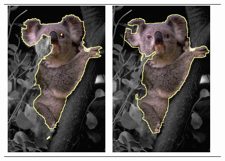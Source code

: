 \documentclass[smallextended]{svjour3}       %
\begin{document}
{{\begin{figure}[ht!]
\begin{tabular}{ccc}
 	\includegraphics[scale=0.25]{images/segmentation/bc/coala/grabcut-seg.png} & 
	\includegraphics[scale=0.25]{images/segmentation/bc/coala/r3/lg1_sq0_dt1_it50.png} &

\end{tabular}
\end{figure}}}
\end{document}
